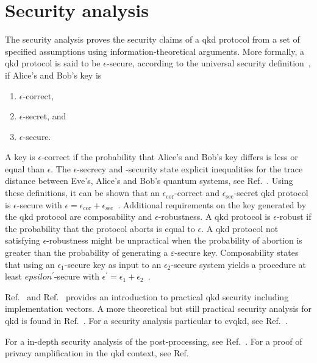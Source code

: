 \section{Security analysis}

The security analysis proves the security claims of a \gls{qkd} protocol from a set of specified assumptions using information-theoretical arguments.
More formally, a \gls{qkd} protocol is said to be $\epsilon$-secure, according to the universal security definition~\cite[p.~119]{Wolf2021}, if Alice's and Bob's key is
\begin{enumerate}
	\item $\epsilon$-correct,
	\item $\epsilon$-secret, and
	\item $\epsilon$-secure.
\end{enumerate}
A key is $\epsilon$-correct if the probability that Alice's and Bob's key differs is less or equal than $\epsilon$.
The $\epsilon$-secrecy and -security state explicit inequalities for the trace distance between Eve's, Alice's and Bob's quantum systems, see Ref.~\cite[p.~120]{Wolf2021}.
Using these definitions, it can be shown that an $\epsilon_\text{cor}$-correct and $\epsilon_\text{sec}$-secret \gls{qkd} protocol is $\epsilon$-secure with $\epsilon=\epsilon_\text{cor}+\epsilon_\text{sec}$~\cite[p.~122]{Wolf2021}.
Additional requirements on the key generated by the \gls{qkd} protocol are composability and $\epsilon$-robustness.
A \gls{qkd} protocol is $\epsilon$-robust if the probability that the protocol aborts is equal to $\epsilon$.
A \gls{qkd} protocol not satisfying $\epsilon$-robustness might be unpractical when the probability of abortion is greater than the probability of generating a $\varepsilon$-secure key.
Composability states that using an $\epsilon_1$-secure key as input to an $\epsilon_2$-secure system yields a procedure at least $epsilon^\prime$-secure with $\epsilon^\prime=\epsilon_1+\epsilon_2$~\cite[p.~10]{Scarani2009}.





Ref.~\cite{Lo2014} and Ref.~\cite{Laudenbach2018} provides an introduction to practical \gls{qkd} security including implementation vectors.
A more theoretical but still practical security analysis for \gls{qkd} is found in Ref.~\cite{Scarani2009}.
For a security analysis particular to \gls{cvqkd}, see Ref.~\cite{Diamanti2015}.

For a in-depth security analysis of the post-processing, see Ref.~\cite{Fung2010}.
For a proof of privacy amplification in the \gls{qkd} context, see Ref.~\cite{Renner2005}